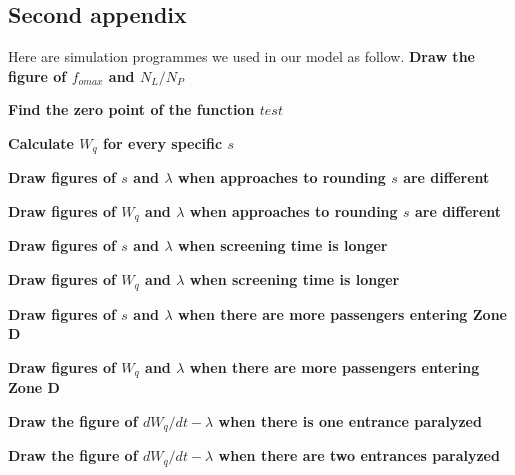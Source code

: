 \documentclass{mcmthesis}
\begin{document}
\begin{appendices}
  

\section{Second appendix}
Here are simulation programmes we used in our model as follow.
\noindent \textbf{\textcolor[rgb]{0.98,0.00,0.00}{Draw the figure of $f_{omax}$ and $N_L/N_P$}}

\textbf{\textcolor[rgb]{0.98,0.00,0.00}{Find the zero point of the function $test$ }}

\textbf{\textcolor[rgb]{0.98,0.00,0.00}{Calculate $W_q$ for every specific $s$}}

\textbf{\textcolor[rgb]{0.98,0.00,0.00}{Draw figures of $s$ and $\lambda$ when approaches to rounding $s$ are different}}

\textbf{\textcolor[rgb]{0.98,0.00,0.00}{Draw figures of $W_q$ and $\lambda$ when approaches to rounding $s$ are different}}

\textbf{\textcolor[rgb]{0.98,0.00,0.00}{Draw figures of $s$ and $\lambda$ when screening time is longer}}

\textbf{\textcolor[rgb]{0.98,0.00,0.00}{Draw figures of $W_q$ and $\lambda$ when screening time is longer}}

\textbf{\textcolor[rgb]{0.98,0.00,0.00}{Draw figures of $s$ and $\lambda$ when there are more passengers entering Zone D}}

\textbf{\textcolor[rgb]{0.98,0.00,0.00}{Draw figures of $W_q$ and $\lambda$ when there are more passengers entering Zone D}}

\noindent \textbf{\textcolor[rgb]{0.98,0.00,0.00}{Draw the figure of $dW_q/dt-\lambda$ when there is one entrance paralyzed}}

\textbf{\textcolor[rgb]{0.98,0.00,0.00}{Draw the figure of $dW_q/dt-\lambda$ when there are two entrances paralyzed }}

\end{appendices}
\end{document}

